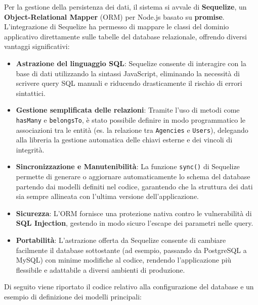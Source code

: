 \documentclass{article}
\begin{document}
Per la gestione della persistenza dei dati, il sistema si avvale di \textbf{Sequelize}, un \textbf{Object-Relational Mapper} (ORM) per Node.js basato su \textbf{promise}. L'integrazione di Sequelize ha permesso di mappare le classi del dominio applicativo direttamente sulle tabelle del database relazionale, offrendo diversi vantaggi significativi:

\begin{itemize}
    \item \textbf{Astrazione del linguaggio SQL}: Sequelize consente di interagire con la base di dati utilizzando la sintassi JavaScript, eliminando la necessità di scrivere query SQL manuali e riducendo drasticamente il rischio di errori sintattici.
    \item \textbf{Gestione semplificata delle relazioni}: Tramite l'uso di metodi come \texttt{hasMany} e \texttt{belongsTo}, è stato possibile definire in modo programmatico le associazioni tra le entità (es. la relazione tra \texttt{Agencies} e \texttt{Users}), delegando alla libreria la gestione automatica delle chiavi esterne e dei vincoli di integrità.
    \item \textbf{Sincronizzazione e Manutenibilità}: La funzione \texttt{sync()} di Sequelize permette di generare o aggiornare automaticamente lo schema del database partendo dai modelli definiti nel codice, garantendo che la struttura dei dati sia sempre allineata con l'ultima versione dell'applicazione.
    \item \textbf{Sicurezza}: L'ORM fornisce una protezione nativa contro le vulnerabilità di \textbf{SQL Injection}, gestendo in modo sicuro l'escape dei parametri nelle query.
    \item \textbf{Portabilità}: L'astrazione offerta da Sequelize consente di cambiare facilmente il database sottostante (ad esempio, passando da PostgreSQL a MySQL) con minime modifiche al codice, rendendo l'applicazione più flessibile e adattabile a diversi ambienti di produzione.
\end{itemize}

Di seguito viene riportato il codice relativo alla configurazione del database e un esempio di definizione dei modelli principali:
\end{document}

